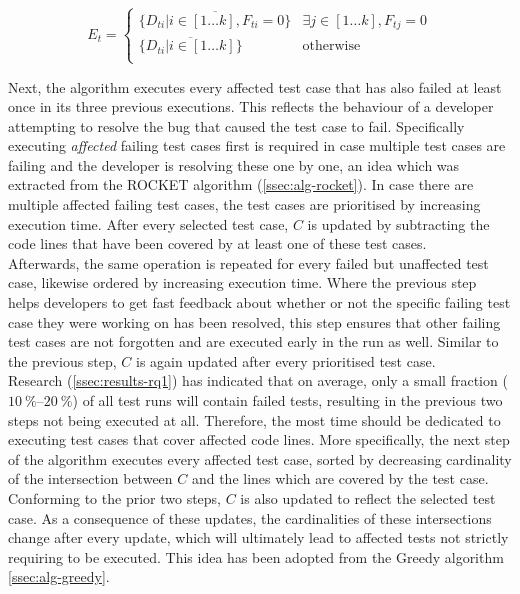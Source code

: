 \[
	E_t = \left.
	\begin{cases}
		\overline{\{D_{ti} \vert i \in [1 \dots k], F_{ti} = 0\}} & \exists j \in [1 \dots k], F_{tj} = 0 \\
		\overline{\{D_{ti} \vert i \in [1 \dots k]\}} & \text{otherwise} \\
	\end{cases}
	\right.
\]

\noindent Next, the algorithm executes every affected test case that has also failed at least once in its three previous executions. This reflects the behaviour of a developer attempting to resolve the bug that caused the test case to fail. Specifically executing \emph{affected} failing test cases first is required in case multiple test cases are failing and the developer is resolving these one by one, an idea which was extracted from the ROCKET algorithm (\autoref{ssec:alg-rocket}). In case there are multiple affected failing test cases, the test cases are prioritised by increasing execution time. After every selected test case, $C$ is updated by subtracting the code lines that have been covered by at least one of these test cases.\\

\noindent Afterwards, the same operation is repeated for every failed but unaffected test case, likewise ordered by increasing execution time. Where the previous step helps developers to get fast feedback about whether or not the specific failing test case they were working on has been resolved, this step ensures that other failing test cases are not forgotten and are executed early in the run as well. Similar to the previous step, $C$ is again updated after every prioritised test case.\\

\noindent Research (\autoref{ssec:results-rq1}) has indicated that on average, only a small fraction ($\SIrange{10}{20}{\percent}$) of all test runs will contain failed tests, resulting in the previous two steps not being executed at all. Therefore, the most time should be dedicated to executing test cases that cover affected code lines. More specifically, the next step of the algorithm executes every affected test case, sorted by decreasing cardinality of the intersection between $C$ and the lines which are covered by the test case. Conforming to the prior two steps, $C$ is also updated to reflect the selected test case. As a consequence of these updates, the cardinalities of these intersections change after every update, which will ultimately lead to affected tests not strictly requiring to be executed. This idea has been adopted from the Greedy algorithm \autoref{ssec:alg-greedy}.\\

